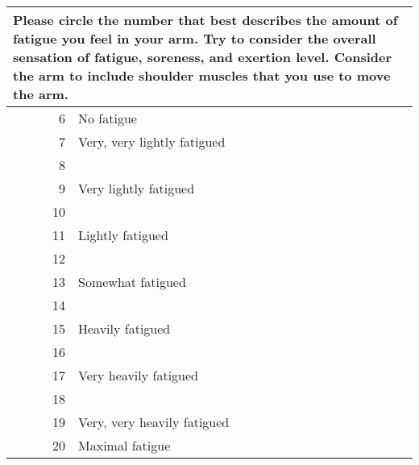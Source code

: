 \begin{tabular}{rl}
\toprule
\multicolumn{2}{l}{
Please circle the number that best describes the amount of fatigue you feel in your arm.
Try to consider the overall sensation of fatigue, soreness, and exertion level.
Consider the arm to include shoulder muscles that you use to move the arm.
} \\
\midrule
6  & No fatigue \\
7  & Very, very lightly fatigued \\
8  & \\
9  & Very lightly fatigued \\
10 & \\
11 & Lightly fatigued \\
12 & \\
13 & Somewhat fatigued \\
14 & \\
15 & Heavily fatigued \\
16 & \\
17 & Very heavily fatigued \\
18 & \\
19 & Very, very heavily fatigued \\
20 & Maximal fatigue \\
\bottomrule
\end{tabular}
